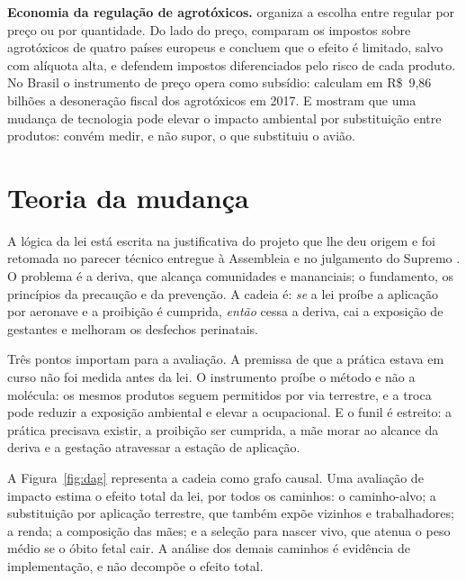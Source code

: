 \textbf{Economia da regulação de agrotóxicos.} 
organiza a escolha entre regular por preço ou por quantidade. Do lado do
preço,  comparam os impostos sobre agrotóxicos de
quatro países europeus e concluem que o efeito é limitado, salvo
com alíquota alta, e  defendem impostos
diferenciados pelo risco de cada produto. No Brasil o instrumento de preço
opera como subsídio:  calculam em R\$~9,86
bilhões a desoneração fiscal dos agrotóxicos em 2017.
E  mostram que uma mudança de tecnologia pode elevar o
impacto ambiental por substituição entre produtos: convém medir, e não supor,
o que substituiu o avião.

\section{Teoria da mudança}

A lógica da lei está escrita na justificativa do projeto que lhe deu origem
\cite{ceara2015pl18} e foi retomada no parecer técnico entregue à Assembleia
\cite{tramas2016parecer} e no julgamento do Supremo \cite{stf2023adi6137}. O
problema é a deriva, que alcança comunidades e mananciais; o fundamento, os
princípios da precaução e da prevenção. A cadeia é: \emph{se} a lei proíbe a aplicação por aeronave e a proibição é
cumprida, \emph{então} cessa a deriva, cai a exposição de gestantes e
melhoram os desfechos perinatais.

Três pontos importam para a avaliação. A premissa de que a prática estava em
curso não foi medida antes da lei. O instrumento proíbe o método e não a molécula: os mesmos produtos seguem
permitidos por via terrestre, e a troca pode reduzir a exposição ambiental e
elevar a ocupacional. E o funil é estreito: a prática precisava existir, a
proibição ser cumprida, a mãe morar ao alcance da deriva e a gestação
atravessar a estação de aplicação.

A Figura~\ref{fig:dag} representa a cadeia como grafo causal. Uma avaliação de
impacto estima o efeito total da lei, por todos os caminhos: o caminho-alvo; a
substituição por aplicação terrestre, que também expõe vizinhos e
trabalhadores; a renda; a composição das mães; e a seleção para nascer vivo,
que atenua o peso médio se o óbito fetal cair. A análise dos demais caminhos é
evidência de implementação, e não decompõe o efeito total.

